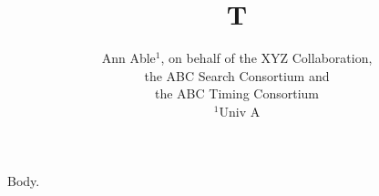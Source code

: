 \documentclass{article}
\begin{document}
\title{T}
\author{Ann Able$^1$, on behalf of the XYZ Collaboration, \\ the ABC Search Consortium and \\ the ABC Timing
Consortium \\ $^1$Univ A}
\maketitle
Body.
\end{document}
